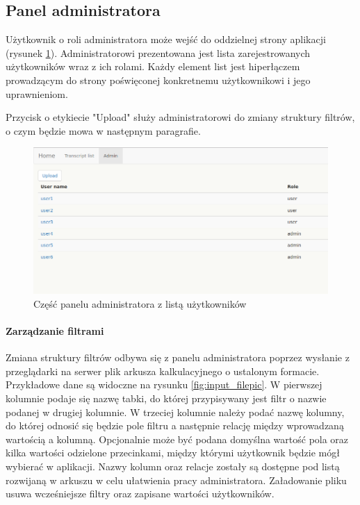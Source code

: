\documentclass[a4paper,12pt,twoside]{article}
\begin{document}
\newpage
\subsection{Panel administratora}
Użytkownik o roli administratora może wejść do oddzielnej strony aplikacji (rysunek \ref{fig:adminpic}). Administratorowi prezentowana jest lista zarejestrowanych użytkowników wraz z ich rolami. Każdy element list jest hiperłączem prowadzącym
do strony poświęconej konkretnemu użytkownikowi i jego uprawnieniom.

Przycisk o etykiecie "Upload" służy administratorowi do zmiany struktury 
filtrów, o czym będzie mowa w następnym paragrafie.


\begin{figure}[h]
  \centering
  \includegraphics[width=\textwidth]{obrazy/aplikacja/admin.png}
  \caption{Część panelu administratora z listą użytkowników}
  \label{fig:adminpic}
\end{figure}

\newpage
\paragraph{Zarządzanie filtrami}

Zmiana struktury filtrów odbywa się z panelu administratora poprzez wysłanie
z przeglądarki na serwer plik arkusza kalkulacyjnego o ustalonym formacie. Przykładowe dane są widoczne na rysunku \ref{fig:input_filepic}.
W pierwszej kolumnie podaje się nazwę tabki, do której przypisywany
jest filtr o nazwie podanej w drugiej kolumnie. W trzeciej kolumnie należy podać nazwę kolumny, do której
odnosić się będzie pole filtru a następnie relację między wprowadzaną wartością a kolumną.
Opcjonalnie może być podana domyślna wartość pola oraz kilka wartości odzielone przecinkami, między którymi użytkownik będzie mógł wybierać w aplikacji. Nazwy kolumn oraz relacje zostały są dostępne pod
listą rozwijaną w arkuszu w celu ułatwienia pracy administratora. 
Załadowanie pliku usuwa wcześniejsze filtry oraz zapisane wartości użytkowników. 
 
\end{document}
